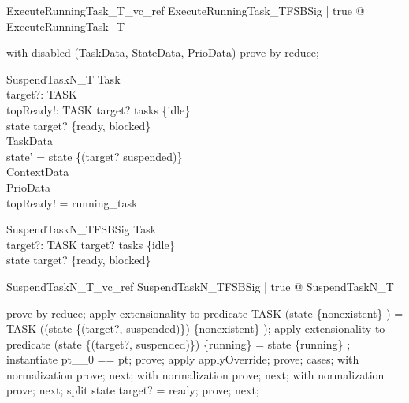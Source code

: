 \begin{theorem}{ExecuteRunningTask\_T\_vc\_ref}
\forall  ExecuteRunningTask\_TFSBSig | true @ \pre  ExecuteRunningTask\_T
\end{theorem}

\begin{zproof}
with disabled (TaskData, StateData, PrioData) prove by reduce;
\end{zproof}

\begin{schema}{SuspendTaskN\_T}
  \Delta Task\\
  target?: TASK\\
  topReady!: TASK
\where
  target? \in  tasks \setminus  \{idle\}\\
  state target? \in  \{ready, blocked\}\\
  \Xi TaskData\\
  state' = state \oplus  \{(target? \mapsto  suspended)\}\\
  \Xi ContextData\\
  \Xi PrioData\\
  topReady! = running\_task
\end{schema}

\begin{schema}{SuspendTaskN\_TFSBSig}
  Task\\
  target?: TASK
\where
  target? \in  tasks \setminus  \{idle\}\\
  state target? \in  \{ready, blocked\}
\end{schema}

\begin{theorem}{SuspendTaskN\_T\_vc\_ref}
\forall  SuspendTaskN\_TFSBSig | true @ \pre  SuspendTaskN\_T
\end{theorem}

\begin{zproof}
prove by reduce;
apply extensionality to predicate TASK \setminus  (state \inv  \limg  \{nonexistent\} \rimg ) = TASK \setminus  ((state \oplus  \{(target?, suspended)\}) \inv  \limg  \{nonexistent\} \rimg );
apply extensionality to predicate (state \oplus  \{(target?, suspended)\}) \inv  \limg  \{running\} \rimg  = state \inv  \limg  \{running\} \rimg ;
instantiate pt\_\_0 == pt;
prove;
apply applyOverride;
prove;
cases;
with normalization prove;
next;
with normalization prove;
next;
with normalization prove;
next;
split state target? = ready;
prove;
next;
\end{zproof}

